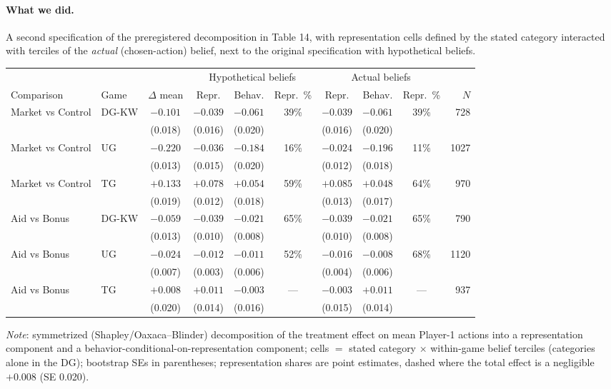 \documentclass[11pt]{article}
\begin{document}
\paragraph{What we did.} A second specification of the preregistered
decomposition in Table 14, with representation cells defined by the stated
category interacted with terciles of the \emph{actual} (chosen-action) belief, next to
the original specification with hypothetical beliefs. 
\begin{center}
\footnotesize
\setlength{\tabcolsep}{4pt}
\renewcommand{\arraystretch}{1.15}
\begin{tabular}{ll c ccc ccc r}
\toprule
& & & \multicolumn{3}{c}{Hypothetical beliefs} & \multicolumn{3}{c}{Actual beliefs} & \\
\cmidrule(lr){4-6}\cmidrule(lr){7-9}
Comparison & Game & $\Delta$ mean & Repr. & Behav. & Repr.\ \% &
Repr. & Behav. & Repr.\ \% & $N$ \\
\midrule
Market vs Control & DG-KW & $-0.101$ & $-0.039$ & $-0.061$ & 39\% & $-0.039$ & $-0.061$ & 39\% & 728 \\
 & & (0.018) & (0.016) & (0.020) & & (0.016) & (0.020) & & \\
\addlinespace[2pt]
Market vs Control & UG & $-0.220$ & $-0.036$ & $-0.184$ & 16\% & $-0.024$ & $-0.196$ & 11\% & 1027 \\
 & & (0.013) & (0.015) & (0.020) & & (0.012) & (0.018) & & \\
\addlinespace[2pt]
Market vs Control & TG & $+0.133$ & $+0.078$ & $+0.054$ & 59\% & $+0.085$ & $+0.048$ & 64\% & 970 \\
 & & (0.019) & (0.012) & (0.018) & & (0.013) & (0.017) & & \\
\addlinespace[2pt]
Aid vs Bonus & DG-KW & $-0.059$ & $-0.039$ & $-0.021$ & 65\% & $-0.039$ & $-0.021$ & 65\% & 790 \\
 & & (0.013) & (0.010) & (0.008) & & (0.010) & (0.008) & & \\
\addlinespace[2pt]
Aid vs Bonus & UG & $-0.024$ & $-0.012$ & $-0.011$ & 52\% & $-0.016$ & $-0.008$ & 68\% & 1120 \\
 & & (0.007) & (0.003) & (0.006) & & (0.004) & (0.006) & & \\
\addlinespace[2pt]
Aid vs Bonus & TG & $+0.008$ & $+0.011$ & $-0.003$ & --- & $-0.003$ & $+0.011$ & --- & 937 \\
 & & (0.020) & (0.014) & (0.016) & & (0.015) & (0.014) & & \\
\bottomrule
\end{tabular}

\smallskip
\begin{minipage}{0.95\textwidth}
\footnotesize\emph{Note}: symmetrized (Shapley/Oaxaca--Blinder)
decomposition of the treatment effect on mean Player-1 actions into a representation
component and a behavior-conditional-on-representation component; cells $=$ stated
category $\times$ within-game belief terciles (categories alone in the DG); bootstrap
SEs in parentheses; representation shares are point estimates, dashed where the total
effect is a negligible $+0.008$ (SE 0.020).
\end{minipage}
\end{center}
\end{document}
